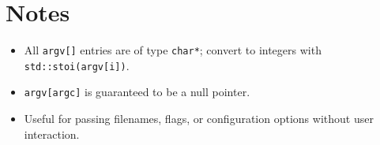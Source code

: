 \documentclass{article}
\begin{document}
\section{Notes}

\begin{itemize}
    \item All \texttt{argv[]} entries are of type \texttt{char*}; convert to integers with \texttt{std::stoi(argv[i])}.
    \item \texttt{argv[argc]} is guaranteed to be a null pointer.
    \item Useful for passing filenames, flags, or configuration options without user interaction.
\end{itemize}
\end{document}
